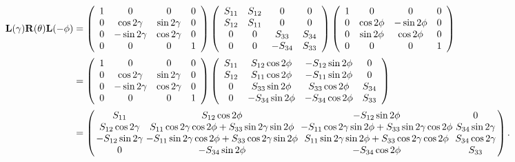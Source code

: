 \documentclass[english,a4paper]{kiseon_memo}
\begin{document}
\begin{align*}
\mathbf{L}(\gamma)\mathbf{R}(\theta)\mathbf{L}(-\phi)
& = \left(\begin{array}{cccc}
1 & 0 & 0 & 0\\
0 & \cos2\gamma & \sin2\gamma & 0\\
0 & -\sin2\gamma & \cos2\gamma & 0\\
0 & 0 & 0 & 1
\end{array}\right)
\left(\begin{array}{cccc}
S_{11} & S_{12} & 0 & 0\\
S_{12} & S_{11} & 0 & 0\\
0 & 0 & S_{33} & S_{34}\\
0 & 0 & -S_{34} & S_{33}
\end{array}\right)
\left(\begin{array}{cccc}
1 & 0 & 0 & 0\\
0 & \cos2\phi & -\sin2\phi & 0\\
0 & \sin2\phi & \cos2\phi & 0\\
0 & 0 & 0 & 1
\end{array}\right)\\[2pt]
& = \left(\begin{array}{cccc}
1 & 0 & 0 & 0\\
0 & \cos2\gamma & \sin2\gamma & 0\\
0 & -\sin2\gamma & \cos2\gamma & 0\\
0 & 0 & 0 & 1
\end{array}\right)
\left(\begin{array}{cccc}
S_{11} & S_{12}\cos2\phi & -S_{12}\sin2\phi & 0\\
S_{12} & S_{11}\cos2\phi & -S_{11}\sin2\phi & 0\\
0 & S_{33}\sin2\phi & S_{33}\cos2\phi & S_{34}\\
0 & -S_{34}\sin2\phi & -S_{34}\cos2\phi & S_{33}
\end{array}\right)\\[2pt]
& = {\setlength{\arraycolsep}{1.5pt}\left(\begin{array}{cccc}
S_{11} & S_{12}\cos2\phi & -S_{12}\sin2\phi & 0\\
S_{12}\cos2\gamma & S_{11}\cos2\gamma\cos2\phi+S_{33}\sin2\gamma\sin2\phi & -S_{11}\cos2\gamma\sin2\phi+S_{33}\sin2\gamma\cos2\phi & S_{34}\sin2\gamma\\
-S_{12}\sin2\gamma & -S_{11}\sin2\gamma\cos2\phi+S_{33}\cos2\gamma\sin2\phi & S_{11}\sin2\gamma\sin2\phi+S_{33}\cos2\gamma\cos2\phi & S_{34}\cos2\gamma\\
0 & -S_{34}\sin2\phi & -S_{34}\cos2\phi & S_{33}
\end{array}\right).}
\end{align*}
\end{document}
